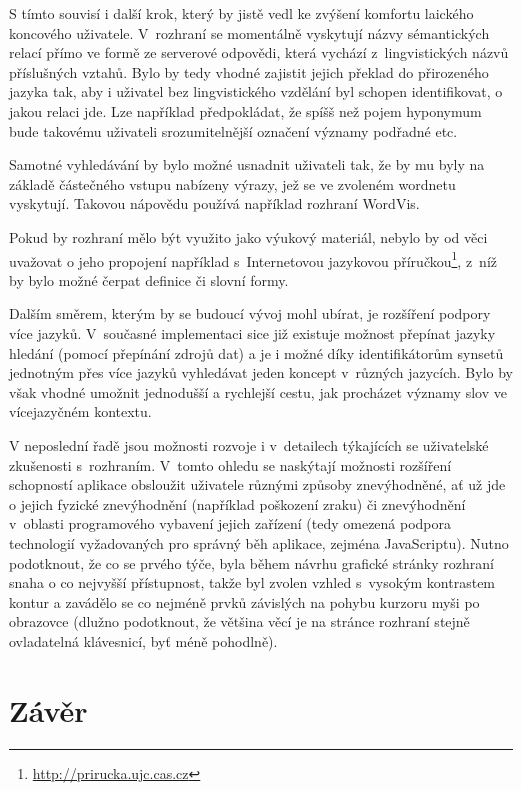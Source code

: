 \documentclass[a4paper, 11pt, oneside, showtrims]{book}
\newcommand\ex{\textsf}
\begin{document}
			S tímto souvisí i další krok, který by jistě vedl ke zvýšení komfortu laického koncového uživatele. V~rozhraní se momentálně vyskytují názvy sémantických relací přímo ve formě ze serverové odpovědi, která vychází z~lingvistických názvů příslušných vztahů. Bylo by tedy vhodné zajistit jejich překlad do přirozeného jazyka tak, aby i uživatel bez lingvistického vzdělání byl schopen identifikovat, o jakou relaci jde. Lze například předpokládat, že spíšš než pojem \ex{hyponymum} bude takovému uživateli srozumitelnější označení \ex{významy podřadné} etc.

			Samotné vyhledávání by bylo možné usnadnit uživateli tak, že by mu byly na základě částečného vstupu nabízeny výrazy, jež se ve zvoleném wordnetu vyskytují. Takovou nápovědu používá například rozhraní WordVis. \parencite{wordvis2010vercruysse}

			Pokud by rozhraní mělo být využito jako výukový materiál, nebylo by od věci uvažovat o jeho propojení například s~Internetovou jazykovou příručkou\footnote{\url{http://prirucka.ujc.cas.cz}}, z~níž by bylo možné čerpat definice či slovní formy.

			Dalším směrem, kterým by se budoucí vývoj mohl ubírat, je rozšíření podpory více jazyků. V~současné implementaci sice již existuje možnost přepínat jazyky hledání (pomocí přepínání zdrojů dat) a je i možné díky identifikátorům synsetů jednotným přes více jazyků vyhledávat jeden koncept v~různých jazycích. Bylo by však vhodné umožnit jednodušší a rychlejší cestu, jak procházet významy slov ve vícejazyčném kontextu.

			V neposlední řadě jsou možnosti rozvoje i v~detailech týkajících se uživatelské zkušenosti s~rozhraním. V~tomto ohledu se naskýtají možnosti rozšíření schopností aplikace obsloužit uživatele různými způsoby znevýhodněné, ať už jde o jejich fyzické znevýhodnění (například poškození zraku) či znevýhodnění v~oblasti programového vybavení jejich zařízení (tedy omezená podpora technologií vyžadovaných pro správný běh aplikace, zejména JavaScriptu). Nutno podotknout, že co se prvého týče, byla během návrhu grafické stránky rozhraní snaha o co nejvyšší přístupnost, takže byl zvolen vzhled s~vysokým kontrastem kontur a zavádělo se co nejméně prvků závislých na pohybu kurzoru myši po obrazovce (dlužno podotknout, že většina věcí je na stránce rozhraní stejně ovladatelná klávesnicí, byť méně pohodlně). 

		\chapter*{Závěr}\label{zaver}
\end{document}
